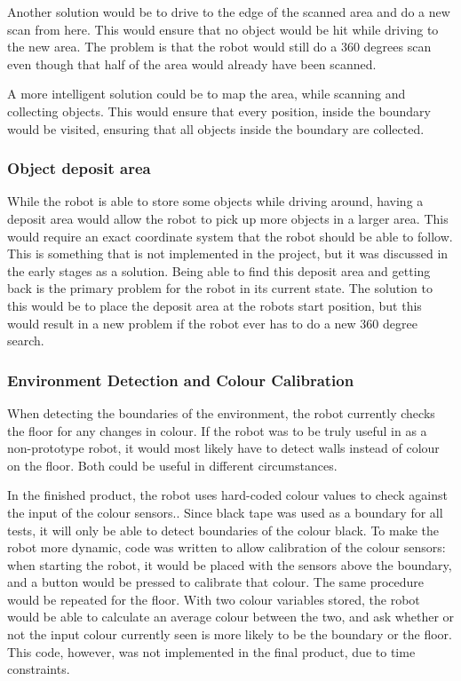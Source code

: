Another solution would be to drive to the edge of the scanned area and do a new scan from here. This would ensure that no object would be hit while driving to the new area. The problem is that the robot would still do a 360 degrees scan even though that half of the area would already have been scanned. 

A more intelligent solution could be to map the area, while scanning and collecting objects. This would ensure that every position, inside the boundary would be visited, ensuring that all objects inside the boundary are collected. 

\subsubsection{Object deposit area}
While the robot is able to store some objects while driving around, having a deposit area would allow the robot to pick up more objects in a larger area. This would require an exact coordinate system that the robot should be able to follow. This is something that is not implemented in the project, but it was discussed in the early stages as a solution. Being able to find this deposit area and getting back is the primary problem for the robot in its current state. The solution to this would be to place the deposit area at the robots start position, but this would result in a new problem if the robot ever has to do a new 360 degree search. 

\subsubsection{Environment Detection and Colour Calibration}
When detecting the boundaries of the environment, the robot currently checks the floor for any changes in colour. If the robot was to be truly useful in as a non-prototype robot, it would most likely have to detect walls instead of colour on the floor. Both could be useful in different circumstances.

In the finished product, the robot uses hard-coded colour values to check against the input of the colour sensors.. Since black tape was used as a boundary for all tests, it will only be able to detect boundaries of the colour black. To make the robot more dynamic, code was written to allow calibration of the colour sensors: when starting the robot, it would be placed with the sensors above the boundary, and a button would be pressed to calibrate that colour. The same procedure would be repeated for the floor. With two colour variables stored, the robot would be able to calculate an average colour between the two, and ask whether or not the input colour currently seen is more likely to be the boundary or the floor. This code, however, was not implemented in the final product, due to time constraints.